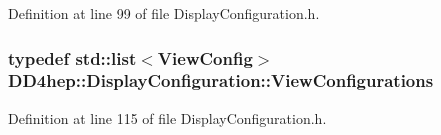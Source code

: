 Definition at line 99 of file DisplayConfiguration.h.\hypertarget{class_d_d4hep_1_1_display_configuration_a38d6c82b57ac859a5d5cf67fe26f4920}{
\subsubsection[{ViewConfigurations}]{\setlength{\rightskip}{0pt plus 5cm}typedef std::list$<${\bf ViewConfig}$>$ {\bf DD4hep::DisplayConfiguration::ViewConfigurations}}}
\label{class_d_d4hep_1_1_display_configuration_a38d6c82b57ac859a5d5cf67fe26f4920}


Definition at line 115 of file DisplayConfiguration.h.

